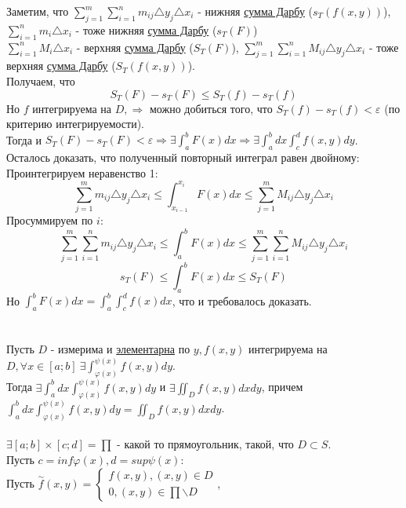 \documentclass[12pt]{article}
\begin{document}
Заметим, что $\sum_{j=1}^m \sum_{i=1}^n m_{ij}{\bigtriangleup y_j}{\bigtriangleup x_i}$ - нижняя \hyperref[darbouxSum]{сумма Дарбу} ($s_T(f(x,y))$), $\sum_{i=1}^n m_i{\bigtriangleup x_i}$ - тоже нижняя \hyperref[darbouxSum]{сумма Дарбу} ($s_T(F)$)\\
$\sum_{i=1}^n M_i{\bigtriangleup x_i}$ - верхняя \hyperref[darbouxSum]{сумма Дарбу} ($S_T(F)$), $\sum_{j=1}^m \sum_{i=1}^n M_{ij}{\bigtriangleup y_j}{\bigtriangleup x_i}$ - тоже верхняя \hyperref[darbouxSum]{сумма Дарбу} ($S_T(f(x,y))$).\\
Получаем, что\\
$$S_T(F) - s_T(F) \leq S_T(f) - s_T(f)$$
Но $f$ интегрируема на $D, \Rightarrow$ можно добиться того, что $S_T(f)-s_T(f) < \varepsilon$ (по критерию интегрируемости).\\
Тогда и $S_T(F)-s_T(F) < \varepsilon \Rightarrow \exists \int_a^b F(x) dx \Rightarrow \exists \int_a^b dx \int_c^d f(x,y)dy$.\\
Осталось доказать, что полученный повторный интеграл равен двойному:\\
Проинтегрируем неравенство 1:\\
$$\sum_{j=1}^m m_{ij}{\bigtriangleup y_j}{\bigtriangleup x_i} \leq \int_{x_{i-1}}^{x_i} F(x) dx \leq \sum_{j=1}^m M_{ij}{\bigtriangleup y_j}{\bigtriangleup x_i}$$
Просуммируем по $i$:\\
$$\sum_{j=1}^m \sum_{i=1}^n m_{ij}{\bigtriangleup y_j}{\bigtriangleup x_i} \leq \int_a^b F(x)dx \leq \sum_{j=1}^m \sum_{i=1}^n M_{ij}{\bigtriangleup y_j}{\bigtriangleup x_i}$$
$$s_T(F) \leq \int_a^b F(x)dx \leq S_T(F)$$
Но $\int_a^b F(x)dx = \int_a^b \int_c^d f(x)dx$, что и требовалось доказать.\\
\\
\\
Пусть $D$ - измерима и \hyperref[elementaryDomain]{элементарна} по $y, f(x,y)$ интегрируема на $D, \forall x \in [a;b] \ \exists \int_{\varphi(x)}^{\psi(x)} f(x,y)dy$.\\
Тогда $\exists \int_a^b dx \int_{\varphi(x)}^{\psi(x)} f(x,y)dy$ и $\exists \iint_D f(x,y)dxdy$, причем $\int_a^b dx \int_{\varphi(x)}^{\psi(x)} f(x,y)dy = \iint_D f(x,y)dxdy$.\\
\\
$\exists [a;b] \times [c;d] = \prod$ - какой то прямоугольник, такой, что $D \subset S$.\\
Пусть $c = inf \varphi(x), d = sup \psi(x)$:\\
Пусть $\overset{\sim}{f}(x,y) = \begin{cases}f(x,y), (x,y) \in D \\ 0, (x,y) \in \prod \backslash D\end{cases}$,\\
\end{document}
